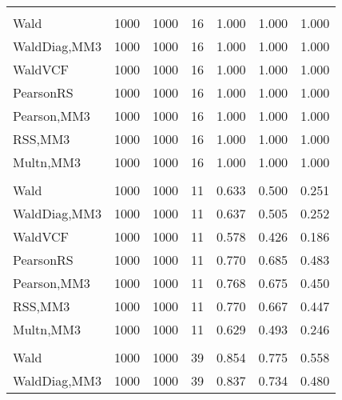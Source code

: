 \documentclass[
]{article}
\begin{document}
\begin{table}[H]
{\begin{tabular}[t]{lrrrrrr}
\addlinespace[0.3em]
\multicolumn{7}{l}{\textbf{1F 15V}}\\
\hspace{1em}Wald & 1000 & 1000 & 16 & 1.000 & 1.000 & 1.000\\
\hspace{1em}WaldDiag,MM3 & 1000 & 1000 & 16 & 1.000 & 1.000 & 1.000\\
\hspace{1em}WaldVCF & 1000 & 1000 & 16 & 1.000 & 1.000 & 1.000\\
\hspace{1em}PearsonRS & 1000 & 1000 & 16 & 1.000 & 1.000 & 1.000\\
\hspace{1em}Pearson,MM3 & 1000 & 1000 & 16 & 1.000 & 1.000 & 1.000\\
\hspace{1em}RSS,MM3 & 1000 & 1000 & 16 & 1.000 & 1.000 & 1.000\\
\hspace{1em}Multn,MM3 & 1000 & 1000 & 16 & 1.000 & 1.000 & 1.000\\
\addlinespace[0.3em]
\multicolumn{7}{l}{\textbf{2F 10V}}\\
\hspace{1em}Wald & 1000 & 1000 & 11 & 0.633 & 0.500 & 0.251\\
\hspace{1em}WaldDiag,MM3 & 1000 & 1000 & 11 & 0.637 & 0.505 & 0.252\\
\hspace{1em}WaldVCF & 1000 & 1000 & 11 & 0.578 & 0.426 & 0.186\\
\hspace{1em}PearsonRS & 1000 & 1000 & 11 & 0.770 & 0.685 & 0.483\\
\hspace{1em}Pearson,MM3 & 1000 & 1000 & 11 & 0.768 & 0.675 & 0.450\\
\hspace{1em}RSS,MM3 & 1000 & 1000 & 11 & 0.770 & 0.667 & 0.447\\
\hspace{1em}Multn,MM3 & 1000 & 1000 & 11 & 0.629 & 0.493 & 0.246\\
\addlinespace[0.3em]
\multicolumn{7}{l}{\textbf{3F 15V}}\\
\hspace{1em}Wald & 1000 & 1000 & 39 & 0.854 & 0.775 & 0.558\\
\hspace{1em}WaldDiag,MM3 & 1000 & 1000 & 39 & 0.837 & 0.734 & 0.480\\

\end{tabular}}
\end{table}
\end{document}
